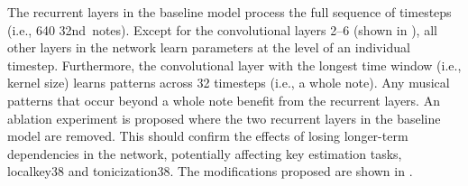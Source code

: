 
The recurrent layers in the baseline model process the full
sequence of timesteps (i.e., 640 \gls{32nd}~notes). Except
for the convolutional layers 2--6 (shown in
), all other layers
in the network learn parameters at the level of an
individual timestep. Furthermore, the convolutional layer
with the longest time window (i.e., kernel size) learns
patterns across 32 timesteps (i.e., a \gls{whole} note). Any
musical patterns that occur beyond a \gls{whole} note
benefit from the recurrent layers. An ablation experiment is
proposed where the two recurrent layers in the baseline
model are removed. This should confirm the effects of losing
longer-term dependencies in the network, potentially
affecting key estimation tasks, \gls{localkey38} and
\gls{tonicization38}. The modifications proposed are shown
in .

